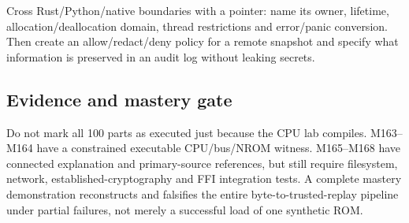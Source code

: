 Cross Rust/Python/native boundaries with a pointer: name its owner, lifetime, allocation/deallocation domain, thread restrictions and error/panic conversion. Then create an allow/redact/deny policy for a remote snapshot and specify what information is preserved in an audit log without leaking secrets.

\subsection{Evidence and mastery gate}\label{evidence-and-mastery-gate}

Do not mark all 100 parts as executed just because the CPU lab compiles. M163--M164 have a constrained executable CPU/bus/NROM witness. M165--M168 have connected explanation and primary-source references, but still require filesystem, network, established-cryptography and FFI integration tests. A complete mastery demonstration reconstructs and falsifies the entire byte-to-trusted-replay pipeline under partial failures, not merely a successful load of one synthetic ROM.
